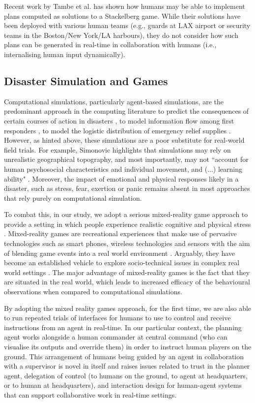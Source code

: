 Recent work by Tambe et al. \cite{tambe:etal:2011}  has shown how humans may be able to  implement plans computed as solutions to a Stackelberg game. While their solutions have been deployed with various human teams  (e.g., guards at LAX airport or security teams in the Boston/New York/LA harbours), they do not consider how such plans can be generated in real-time in collaboration with humans (i.e., internalising human input dynamically).


\subsection{Disaster Simulation and Games} \label{sec:simulationvgames}
Computational simulations, particularly agent-based simulations, are the predominant approach in the computing literature to predict the consequences of certain courses of action in disasters \cite{Hawe2012}, to model information flow among first responders \cite{Robinson},  to model the logistic distribution of emergency relief supplies \cite{Lee2009}. However, as hinted above, these simulations are a poor substitute for real-world field trials. For example, Simonovic highlights that simulations may rely on unrealistic geographical topography, and most importantly, may not ``account for human psychosocial characteristics and individual movement, and (...) learning ability" \cite{Simonovic2010}.  Moreover, the impact of emotional and physical responses likely in a disaster, such as stress, fear, exertion or panic \cite{Drury2009} remains absent in most approaches that rely purely on computational simulation.

To combat this, in our study, we adopt a serious mixed-reality game approach to provide a setting in which people experience realistic cognitive and physical stress \cite{Fischer}. Mixed-reality games are recreational experiences that make use of pervasive technologies such as smart phones, wireless technologies and sensors with the aim of blending game events into a real world environment  \cite{Benford2005a} . Arguably, they have become an established vehicle to explore socio-technical issues in complex real world settings \cite{Crabtree2006a}. The major advantage of mixed-reality games is the fact that they are situated in the real world, which  leads to increased efficacy of the behavioural observations when compared to computational simulations. 

By adopting the mixed reality games approach, for the first time, we are also able to run repeated trials of interfaces for humans to use to control and receive instructions from an agent in real-time. In our particular context, the planning agent works alongside a human commander at central command (who can visualise its outputs and override them) in order to instruct human players on the ground. This arrangement of humans being guided by an agent in collaboration with a supervisor is novel in itself and raises issues related to trust in the planner agent, delegation of control (to humans on the ground, to agent at headquarters, or to human at headquarters), and interaction design for human-agent systems that can support collaborative work in real-time settings.

